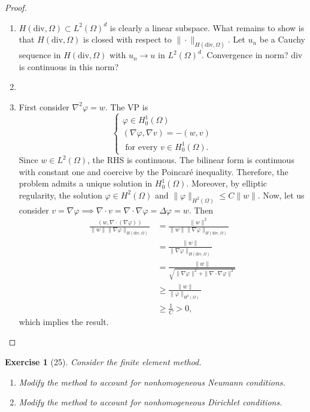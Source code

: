 \documentclass[letterpaper,twoside,11pt]{article}
\theoremstyle{mystyle}
\newtheorem*{exercise}{Exercise}
\newcommand{\cbk}{\color{black}}
\newcommand{\cred}{\color{red}}
\newcommand{\cblu}{\color{blue}}
\newcommand{\Hdiv}{H\left( \text{div}, \Omega \right)}
\newcommand{\Ltwo}{L^2 \left( \Omega \right)}
\begin{document}
\cblu
\begin{proof}
  \begin{enumerate}
    \item $\Hdiv \subset \Ltwo^d$ is clearly a linear subspace. What remains to show is that $\Hdiv$ is closed with respect to $\|\cdot\|_{\Hdiv}$. Let $u_n$ be a Cauchy sequence in $\Hdiv$ with $u_n \to u$ in $\Ltwo^d$. 
    \cred Convergence in norm? div is continuous in this norm? \cblu
    
    \item 
    \item First consider $\nabla^2\varphi = w$. The VP is 
    \[\left\{ {\begin{array}{*{20}{l}}
      \varphi \in H_0^1 \left( \Omega \right)\\[.2cm]
      \left( \nabla \varphi, \nabla v \right) = - \left( w, v \right)\\[.2cm]
      \text{ for every } v \in H_0^1 \left( \Omega \right).
    \end{array}} \right.\]
    Since $w \in \Ltwo$, the RHS is continuous. The bilinear form is continuous with constant one and coercive by the Poincar\'e inequality. Therefore, the problem admits a unique solution in $H_0^1(\Omega)$. Moreover, by elliptic regularity, the solution \(\varphi \in H^2 \left( \Omega \right)\) and $\|\varphi\|_{H^2(\Omega)} \leq C \|w\|$.
    Now, let us consider $v = \nabla \varphi \implies \nabla \cdot v = \nabla \cdot \nabla \varphi = \Delta \varphi = w$. Then 
    \begin{align*}
      \frac{(w, \nabla \cdot (\nabla \varphi))}{\|w\| \|\nabla \varphi\|_{\Hdiv}}&=\frac{\|w\|^2 }{\|w\| \|\nabla \varphi\|_{\Hdiv}}\\[.2cm] 
      &= \frac{\|w\|}{\|\nabla \varphi\|_{\Hdiv}}\\[.2cm]
      &= \frac{\|w\|}{\sqrt{\|\nabla \varphi \|^2 + \|\nabla \cdot \nabla \varphi \|^2 }}\\[.2cm]
      &\geq \frac{\|w\|}{\|\varphi\|_{H^2 (\Omega)}}\\[.2cm]
      &\geq \frac{1}{C} > 0,
    \end{align*}
    which implies the result. 

  \end{enumerate}
\end{proof}
\cbk 




\newpage 
\begin{exercise}[25] 
  Consider the finite element method. 
  \begin{enumerate}
    \item Modify the method to account for nonhomogeneous Neumann conditions. 
    \item Modify the method to account for nonhomogeneous Dirichlet conditions. 
  \end{enumerate}
\end{exercise}
\end{document}
